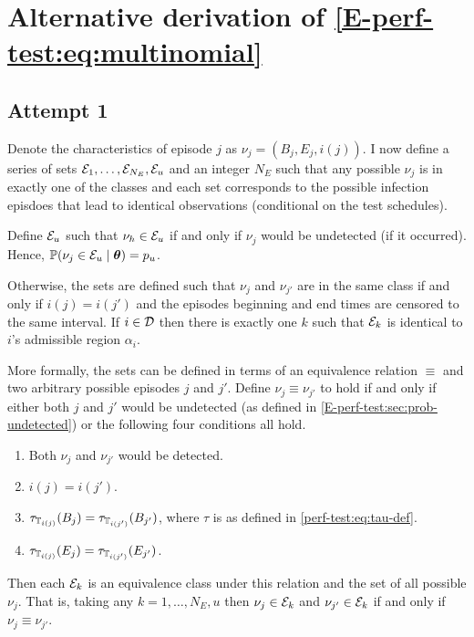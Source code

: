 \documentclass[thesis.tex]{subfiles}
\begin{document}
\chapter{Alternative derivation of \cref{E-perf-test:eq:multinomial}} \label{perf-test:sec:alt-likelihood}

\section{Attempt 1}

Denote the characteristics of episode $j$ as $\nu_j = (B_j, E_j, i(j))$.
I now define a series of sets $\mathcal{E}_1, \dots, \mathcal{E}_{N_E}, \mathcal{E}_u$ and an integer $N_E$ such that any possible $\nu_j$ is in exactly one of the classes and each set corresponds to the possible infection episdoes that lead to identical observations (conditional on the test schedules).

Define $\mathcal{E}_u$ such that $\nu_h \in \mathcal{E}_u$ if and only if $\nu_j$ would be undetected (if it occurred).
Hence, $\operatorname{\mathbb{P}}(\nu_j \in \mathcal{E}_u \mid \bm{\theta}) = p_u$.

Otherwise, the sets are defined such that $\nu_j$ and $\nu_{j'}$ are in the same class if and only if $i(j) = i(j')$ and the episodes beginning and end times are censored to the same interval.
If $i \in \mathcal{D}$ then there is exactly one $k$ such that $\mathcal{E}_k$ is identical to $i$'s admissible region $\alpha_i$.

More formally, the sets can be defined in terms of an equivalence relation $\equiv$ and two arbitrary possible episodes $j$ and $j'$.
Define $\nu_j \equiv \nu_{j'}$ to hold if and only if either both $j$ and $j'$ would be undetected (as defined in \cref{E-perf-test:sec:prob-undetected}) or the following four conditions all hold.
\begin{enumerate}
    \item Both $\nu_j$ and $\nu_{j'}$ would be detected.
    \item $i(j) = i(j')$.
    \item $\tau_{\mathbb{T}_{i(j)}}(B_j) = \tau_{\mathbb{T}_{i(j')}}(B_{j'})$, where $\tau$ is as defined in \cref{perf-test:eq:tau-def}.
    \item $\tau_{\mathbb{T}_{i(j)}}(E_j) = \tau_{\mathbb{T}_{i(j')}}(E_{j'})$.
\end{enumerate}
Then each $\mathcal{E}_k$ is an equivalence class under this relation and the set of all possible $\nu_j$.
That is, taking any $k = 1, \dots, N_E, u$ then $\nu_j \in \mathcal{E}_k$ and $\nu_{j'} \in \mathcal{E}_k$ if and only if $\nu_j \equiv \nu_{j'}$.
\end{document}
